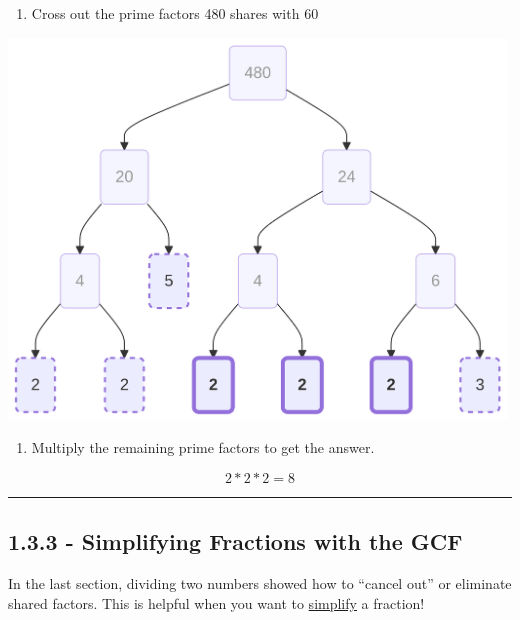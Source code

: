 \documentclass[
  letterpaper,
  DIV=11,
  numbers=noendperiod]{scrreprt}
\providecommand{\tightlist}{%
  \setlength{\itemsep}{0pt}\setlength{\parskip}{0pt}}
\begin{document}
\begin{enumerate}
\def\labelenumi{\arabic{enumi}.}
\setcounter{enumi}{1}
\tightlist
\item
  Cross out the prime factors 480 shares with 60
\end{enumerate}

\includegraphics[width=5.2in,height=3.98in]{chapters/Unit_1/1.3_GCF_&_Simplifying_Fractions_files/figure-latex/mermaid-figure-9.png}

\begin{enumerate}
\def\labelenumi{\arabic{enumi}.}
\setcounter{enumi}{2}
\tightlist
\item
  Multiply the remaining prime factors to get the answer.
\end{enumerate}

\[2 * 2 * 2 = 8\]

\begin{center}\rule{0.5\linewidth}{0.5pt}\end{center}

\subsection*{1.3.3 - Simplifying Fractions with the
GCF}\label{simplifying-fractions-with-the-gcf}

In the last section, dividing two numbers showed how to ``cancel out''
or eliminate shared factors. This is helpful when you want to
\href{./glossary.html\#glossary-simplify}{simplify} a fraction!
\end{document}
